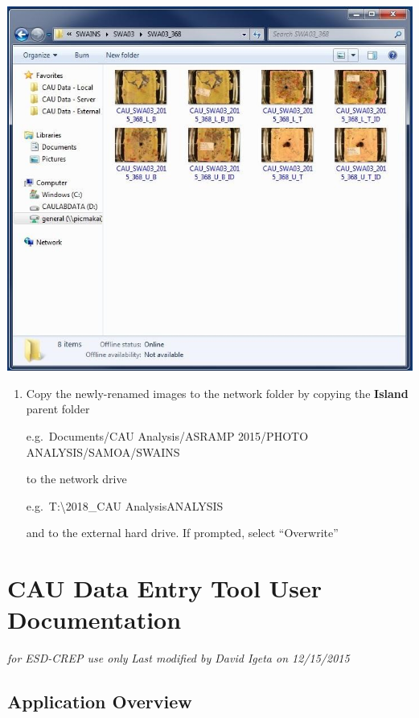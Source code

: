 \documentclass[
]{book}
\begin{document}
\includegraphics{images/Camera18.jpg}

\begin{enumerate}
\def\labelenumi{\arabic{enumi}.}
\setcounter{enumi}{20}
\item
  Copy the newly-renamed images to the network folder by copying the \textbf{Island} parent folder

  e.g.~Documents/CAU Analysis/ASRAMP 2015/PHOTO ANALYSIS/SAMOA/SWAINS

  to the network drive

  e.g.~T:\Oceanography\CAUs\Analysis\textbackslash2018\_CAU Analysis\PHOTO ANALYSIS\SAMOA\SWAINS  

  and to the external hard drive. If prompted, select ``Overwrite''
\end{enumerate}

\hypertarget{cau-data-entry-tool-user-documentation}{%
\section{CAU Data Entry Tool User Documentation}\label{cau-data-entry-tool-user-documentation}}

\emph{for ESD-CREP use only}
\emph{Last modified by David Igeta on 12/15/2015}

\hypertarget{application-overview}{%
\subsection{Application Overview}\label{application-overview}}
\end{document}
